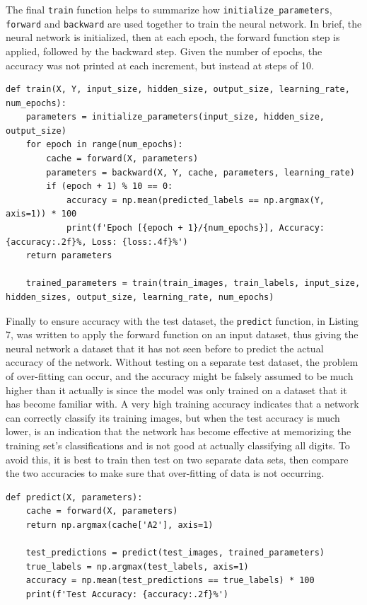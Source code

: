 \documentclass[twocolumn]{article}
\begin{document}
The final \texttt{train} function helps to summarize how \texttt{initialize\_parameters}, \texttt{forward} and \texttt{backward} are used together to train the neural network. In brief, the neural network is initialized, then at each epoch, the forward function step is applied, followed by the backward step. Given the number of epochs, the accuracy was not printed at each increment, but instead at steps of 10.
\begin{lstlisting}[caption={Combininig all of the functions for the Multilayer Perceptron with Backpropagation. Note some non-essential code has been removed but this should not hinder understanding.},captionpos=b]
    def train(X, Y, input_size, hidden_size, output_size, learning_rate, num_epochs):
    parameters = initialize_parameters(input_size, hidden_size, output_size)
    for epoch in range(num_epochs):
        cache = forward(X, parameters)
        parameters = backward(X, Y, cache, parameters, learning_rate)
        if (epoch + 1) % 10 == 0:
            accuracy = np.mean(predicted_labels == np.argmax(Y, axis=1)) * 100
            print(f'Epoch [{epoch + 1}/{num_epochs}], Accuracy: {accuracy:.2f}%, Loss: {loss:.4f}%')
    return parameters

    trained_parameters = train(train_images, train_labels, input_size, hidden_sizes, output_size, learning_rate, num_epochs)
\end{lstlisting}
Finally to ensure accuracy with the test dataset, the \texttt{predict} function, in Listing 7, was written to apply the forward function on an input dataset, thus giving the neural network a dataset that it has not seen before to predict the actual accuracy of the network. Without testing on a separate test dataset, the problem of over-fitting can occur, and the accuracy might be falsely assumed to be much higher than it actually is since the model was only trained on a dataset that it has become familiar with. A very high training accuracy indicates that a network can correctly classify its training images, but when the test accuracy is much lower, is an indication that the network has become effective at memorizing the training set's classifications and is not good at actually classifying all digits. \cite{nielsen2} To avoid this, it is best to train then test on two separate data sets, then compare the two accuracies to make sure that over-fitting of data is not occurring. 
\begin{lstlisting}[caption={The prediction function and its application of the test dataset with the neural network},captionpos=b]
    def predict(X, parameters):
    cache = forward(X, parameters)
    return np.argmax(cache['A2'], axis=1)

    test_predictions = predict(test_images, trained_parameters)
    true_labels = np.argmax(test_labels, axis=1)
    accuracy = np.mean(test_predictions == true_labels) * 100
    print(f'Test Accuracy: {accuracy:.2f}%')
\end{lstlisting}
\end{document}

